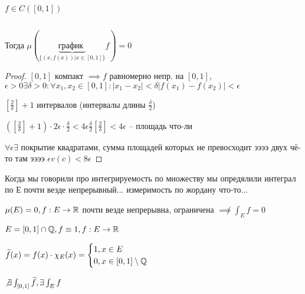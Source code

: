     \begin{remark}
        $f \in C([0, 1])$ 

        \par $ $ 

        Тогда $\mu (\underbrace{\text{график }}_{ \{ (x, f(x)) | x \in [0, 1]\} } f) = 0$
    \end{remark}
    \begin{proof}
        $[0, 1]$ компакт $\implies f$ равномерно непр. на $[0, 1]$, $\epsilon > 0 \exists \delta > 0:
        \forall x_1, x_2 \in [0, 1]: |x_1 - x_2| < \delta |f(x_1) - f(x_2)| < \epsilon
        $

        $[\frac{2}{\delta}] + 1$ интервалов (интервалы длины $\frac{\delta}{2}$)
        
        $([\frac{2}{\delta}] + 1) \cdot 2\epsilon \cdot \frac{\delta}{2} < 
        4\epsilon \frac{\delta}{2} [\frac{2}{\delta}] < 4\epsilon
        $ -- площадь что-ли

        $\forall \epsilon \exists$ покрытие квадратами, сумма площадей которых
        не превосходит ээээ двух чё-то там ээээ $\epsilon v(c) < 8\epsilon$
    \end{proof}

    Когда мы говорили про интегрируемость по множеству мы опредялили интеграл 
    по Е почти везде непрерывный... измеримость по жордану что-то...

    $\mu(E) = 0, f: E \to \mathbb{R}$ почти везде непрерывна, ограничена 
    $\not\implies \int_E f = 0$

    $E = [0, 1] \cap \mathbb{Q}, f \equiv 1, f: E \to \mathbb{R} $

    $\widetilde{f}(x) = f(x) \cdot\chi_E(x) = \begin{cases}
        1, x \in E \\
        0, x \in [0, 1] \setminus \mathbb{Q}
    \end{cases}
    $

    $\not\exists \int_{[0, 1]}\widetilde{f}, \exists \int_E f$


